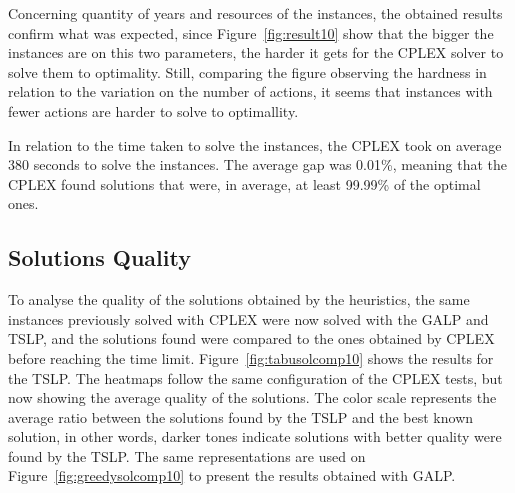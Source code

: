 Concerning quantity of years and resources of the instances, the obtained results confirm what was expected, since 
Figure~\ref{fig:result10}
show that the bigger the instances are on this two parameters, the harder it gets for the CPLEX solver to solve them to optimality. 
Still, comparing the figure observing the hardness in relation to the variation on the number of actions, it seems that instances with fewer actions are 
harder to solve to optimallity.

In relation to the time taken to solve the instances, the CPLEX took on average 380 seconds to solve the instances. The average gap was 
0.01\%, meaning that the CPLEX found solutions that were, in average, at least 99.99\% of the optimal ones.

\subsection{Solutions Quality}

To analyse the quality of the solutions obtained by the heuristics, the same instances previously solved with CPLEX were now solved with
the GALP and TSLP, and the solutions found were compared to the ones obtained by CPLEX before reaching the time limit. 
Figure~\ref{fig:tabusolcomp10} shows the results for the TSLP. The heatmaps follow the same configuration 
of the CPLEX tests, but now showing the average quality of the solutions. The color scale represents
the average ratio between the solutions found by the TSLP and the best known solution, in other words, darker tones indicate solutions
with better quality were found by the TSLP. The same representations are used on Figure~\ref{fig:greedysolcomp10} 
to present the results obtained with GALP.

\begin{figure}[H]
  \begin{center}
  \resizebox{\columnwidth}{!}{%
    \subfloat[1 resource]{}
    \subfloat[2 resources]{}
    \subfloat[4 resources]{}
  }
  \end{center}
\end{figure}

\figspaces
\begin{figure}[H]
  \begin{center}
  \resizebox{\columnwidth}{!}{%
    \subfloat[1 resource]{}
    \subfloat[2 resources]{}
    \subfloat[4 resources]{}
  }
  \end{center}
\end{figure}


